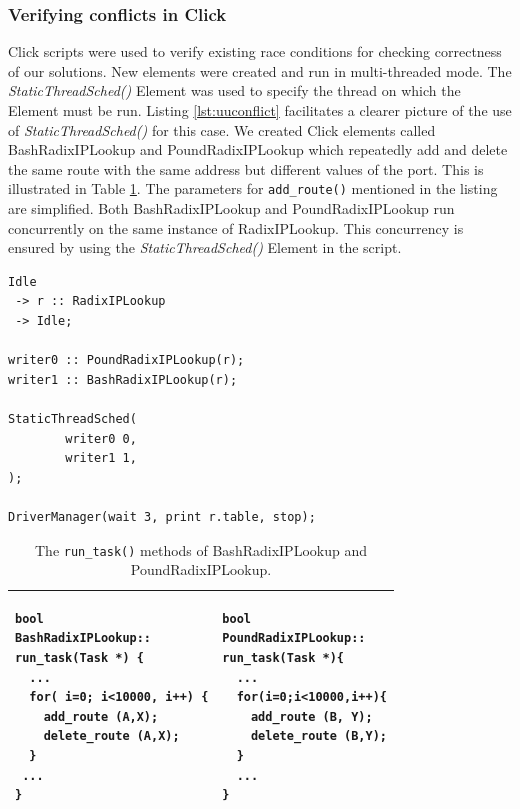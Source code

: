 \documentclass[a4paper]{article}
\begin{document}
\subsubsection{Verifying conflicts in Click}
\label{sec:uuconflicts}
 Click scripts were used to verify existing race conditions for checking correctness of our solutions. New elements were created and run in multi-threaded mode. The \emph{StaticThreadSched()} Element was used to specify the thread on which the Element must be run. Listing \ref{lst:uuconflict} facilitates a clearer picture of the use of \emph{StaticThreadSched()} for this case. We created Click elements called BashRadixIPLookup and PoundRadixIPLookup which repeatedly add and delete the same route with the same address but different values of the port. This is illustrated in Table \ref{tbl:uuverify}. The parameters for \texttt{add\_route()} mentioned in the listing are simplified. Both BashRadixIPLookup and PoundRadixIPLookup run concurrently on the same instance of RadixIPLookup. This concurrency is ensured by using the \emph{StaticThreadSched()} Element in the script.
\begin{lstlisting}[float=tph, caption=Click script for verifying updater-updater conflicts.,label=lst:uuconflict]
Idle
 -> r :: RadixIPLookup
 -> Idle;

writer0 :: PoundRadixIPLookup(r);
writer1 :: BashRadixIPLookup(r);

StaticThreadSched(
        writer0 0,
        writer1 1,
);

DriverManager(wait 3, print r.table, stop);

\end{lstlisting}
\begin{table}
\begin{center}
\begin{tabular}{|p{2.2in}|p{2.2in}|}
\hline
\begin{lstlisting}[label=lst:uubashradixiplookup]
bool
BashRadixIPLookup::
run_task(Task *) {
  ...
  for( i=0; i<10000, i++) {
    add_route (A,X);
    delete_route (A,X);
  }
 ...
}
\end{lstlisting}
&
\begin{lstlisting}[label=lst:uupoundradixiplookup]
bool
PoundRadixIPLookup::
run_task(Task *){
  ...
  for(i=0;i<10000,i++){
    add_route (B, Y);
    delete_route (B,Y);
  }
  ...
}
\end{lstlisting}\\
\hline
\end{tabular}
\end{center}
\caption{The \texttt{run\_task()} methods of BashRadixIPLookup and PoundRadixIPLookup.}
\label{tbl:uuverify}
\end{table}
\end{document}
